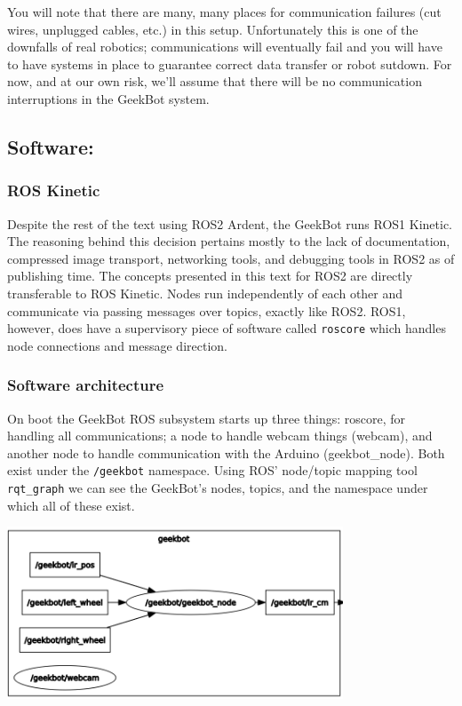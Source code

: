 You will note that there are many, many places for communication
failures (cut wires, unplugged cables, etc.) in this setup.
Unfortunately this is one of the downfalls of real robotics;
communications will eventually fail and you will have to have systems in
place to guarantee correct data transfer or robot sutdown. For now, and
at our own risk, we'll assume that there will be no communication
interruptions in the GeekBot system.

\hypertarget{software}{%
\subsection{Software:}\label{software}}

\hypertarget{ros-kinetic}{%
\subsubsection{ROS Kinetic}\label{ros-kinetic}}

Despite the rest of the text using ROS2 Ardent, the GeekBot runs ROS1
Kinetic. The reasoning behind this decision pertains mostly to the lack
of documentation, compressed image transport, networking tools, and
debugging tools in ROS2 as of publishing time. The concepts presented in
this text for ROS2 are directly transferable to ROS Kinetic. Nodes run
independently of each other and communicate via passing messages over
topics, exactly like ROS2. ROS1, however, does have a supervisory piece
of software called \texttt{roscore} which handles node connections and
message direction.

\hypertarget{software-architecture}{%
\subsubsection{Software architecture}\label{software-architecture}}

On boot the GeekBot ROS subsystem starts up three things: roscore, for
handling all communications; a node to handle webcam things (webcam),
and another node to handle communication with the Arduino
(geekbot\_node). Both exist under the \texttt{/geekbot} namespace. Using
ROS' node/topic mapping tool \texttt{rqt\_graph} we can see the
GeekBot's nodes, topics, and the namespace under which all of these
exist.

\includegraphics[width=0.75\textwidth,height=\textheight]{figures/geekbot/graphics/geekbot_nodes.png}

